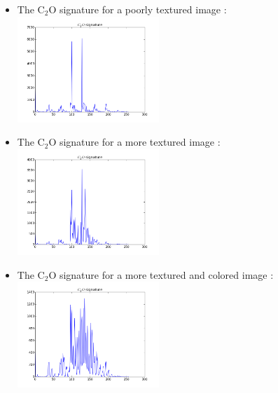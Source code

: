 \documentclass[xcolor=table]{beamer}
\begin{document}
\begin{frame}
\begin{itemize}
\item<1-> The C$_2$O signature for a poorly textured image :
 {\includegraphics[height=4cm]{C2OSig61p.png}}
\item<2-> The C$_2$O signature for a more textured image :
 {\includegraphics[height=4cm]{C2OSig119p.png}}
\item<3-> The C$_2$O signature for a more textured and colored image :
 {\includegraphics[height=4cm]{C2OSig97p.png}}

\end{itemize}



\end{frame}
\end{document}
